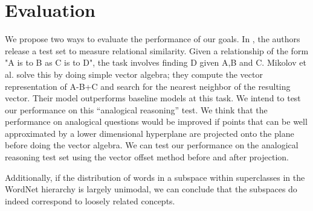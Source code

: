 \section{Evaluation}\label{sec:evaluation}

We propose two ways to evaluate the performance of our goals. 
In \cite{mikolov3}, the authors release a test set to measure relational similarity. 
Given a relationship of the form "A is to B as C is to D", the task involves finding D given A,B and C. 
Mikolov et al. 
solve this by doing simple vector algebra; they compute the vector representation of A-B+C and search for the nearest neighbor of the resulting vector. 
Their model outperforms baseline models at this task. 
We intend to test our performance on this “analogical reasoning” test. 
We think that the performance on analogical questions would be improved if points that can be well approximated by a lower dimensional hyperplane are projected onto the plane before doing the vector algebra. 
We can test our performance on the analogical reasoning test set using the vector offset method before and after projection. 

Additionally, if the distribution of words in a subspace within superclasses in the WordNet hierarchy is largely unimodal, we can conclude that the subspaces do indeed correspond to loosely related concepts. 
